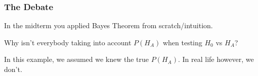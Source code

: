 \documentclass[slides]{beamer}
\newcommand{\blue}[1]{\textcolor{blue2}{#1}}
\begin{document}
\begin{frame}[fragile]
\frametitle{The Debate}

In the midterm you applied Bayes Theorem from scratch/intuition.
\pause
\vspace{0.5cm}

Why isn't everybody taking into account $P(H_A)$ when testing $H_0$ vs $H_A$?
\pause
\vspace{0.5cm}

In this example, we assumed we \blue{knew} the true $P(H_A)$.  In real life however, we don't.


\end{frame}



%
%
\end{document}
